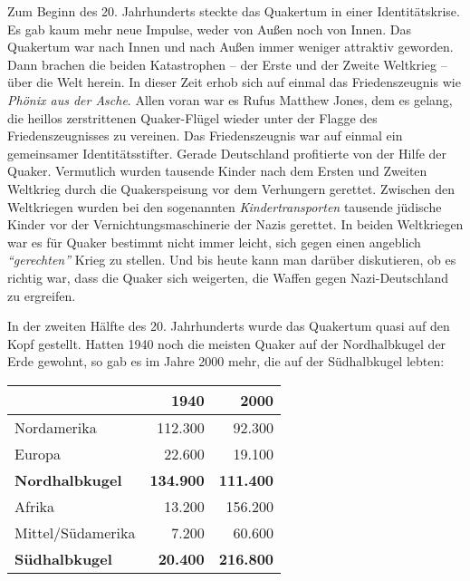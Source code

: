 Zum Beginn des 20. Jahrhunderts steckte das Quakertum in einer Identitätskrise.
Es gab kaum mehr neue Impulse, weder von Außen
noch von Innen. Das Quakertum war
nach Innen und nach Außen immer weniger attraktiv geworden. Dann brachen die
beiden Katastrophen -- der Erste und der Zweite Weltkrieg --
über die Welt
herein. In dieser Zeit erhob sich auf einmal das Friedenszeugnis wie
\textit{Phönix aus der Asche}. Allen voran war es Rufus Matthew Jones,
 dem
es gelang, die heillos zerstrittenen Quaker-Flügel wieder unter der Flagge des
Friedenszeugnisses zu vereinen. Das Friedenszeugnis war auf einmal ein
gemeinsamer Identitätsstifter. Gerade Deutschland
 profitierte von der Hilfe der
Quaker. Vermutlich wurden tausende Kinder nach dem Ersten und Zweiten Weltkrieg
durch die Quakerspeisung vor dem Verhungern gerettet.
Zwischen den Weltkriegen
wurden bei den sogenannten \textit{Kindertransporten}
tausende jüdische Kinder
vor der Vernichtungsmaschinerie der Nazis gerettet. In beiden Weltkriegen war es
für Quaker bestimmt nicht immer leicht, sich gegen einen
angeblich \textit{"`gerechten"'}
Krieg zu stellen. Und bis heute kann man darüber diskutieren, ob es richtig
war, dass die Quaker sich weigerten, die Waffen gegen Nazi-Deutschland zu
ergreifen.

\medskip

In der zweiten Hälfte des 20. Jahrhunderts wurde das Quakertum quasi auf den
Kopf
gestellt. Hatten 1940 noch die meisten Quaker auf der Nordhalbkugel der Erde
gewohnt, so gab es im Jahre 2000 mehr, die auf der Südhalbkugel lebten:

\begin{center}
\begin{tabular}{|l|r|r|} \hline
                        & \textbf{1940}        & \textbf{2000}    \\ \hline
\hline
Nordamerika             & 112.300              & 92.300           \\ \hline
Europa                  & 22.600               & 19.100           \\ \hline
\textbf{Nordhalbkugel}  & \textbf{134.900}     & \textbf{111.400} \\ \hline
Afrika                  & 13.200               & 156.200          \\ \hline
Mittel/Südamerika       & 7.200                & 60.600           \\ \hline
\textbf{Südhalbkugel}   & \textbf{20.400}      & \textbf{216.800} \\ \hline
\end{tabular}
\end{center}


